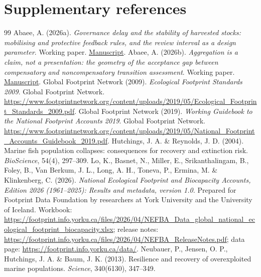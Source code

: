 \documentclass[11pt,a4paper]{article}
\begin{document}
\section*{Supplementary references}
\begin{thebibliography}{99}
\small
{} Abaee, A. (2026a). \emph{Governance delay and the stability of harvested stocks: mobilising and protective feedback rules, and the review interval as a design parameter}. Working paper. \href{https://github.com/MIKEAA2020/general-sustainability/blob/2efaa62083f2007dec3446c15c475af88f0925f3/arena%20agent%201/paper%20rewrites/latex/paper4_delay_dynamics_v41.pdf}{Manuscript}.
 Abaee, A. (2026b). \emph{Aggregation is a claim, not a presentation: the geometry of the acceptance gap between compensatory and noncompensatory transition assessment}. Working paper. \href{https://github.com/MIKEAA2020/general-sustainability/blob/2efaa62083f2007dec3446c15c475af88f0925f3/arena%20agent%201/paper%20rewrites/latex/paper06_assessment_separation_v71.pdf}{Manuscript}.
 Global Footprint Network (2009). \emph{Ecological Footprint Standards 2009}. Global Footprint Network. \url{https://www.footprintnetwork.org/content/uploads/2019/05/Ecological_Footprint_Standards_2009.pdf}.
 Global Footprint Network (2019). \emph{Working Guidebook to the National Footprint Accounts 2019}. Global Footprint Network. \url{https://www.footprintnetwork.org/content/uploads/2019/05/National_Footprint_Accounts_Guidebook_2019.pdf}.
 Hutchings, J. A. \& Reynolds, J. D. (2004). Marine fish population collapses: consequences for recovery and extinction risk. \emph{BioScience}, 54(4), 297--309.
 Lo, K., Basnet, N., Miller, E., Srikanthalingam, B., Foley, B., Van Berkum, J. L., Long, A. H., Toneva, P., Ermina, M. \& Klinkenberg, C. (2026). \emph{National Ecological Footprint and Biocapacity Accounts, Edition 2026 (1961--2025): Results and metadata, version 1.0.} Prepared for Footprint Data Foundation by researchers at York University and the University of Iceland. Workbook: \url{https://footprint.info.yorku.ca/files/2026/04/NEFBA_Data_global_national_ecological_footprint_biocapacity.xlsx}; release notes: \url{https://footprint.info.yorku.ca/files/2026/04/NEFBA_ReleaseNotes.pdf}; data page: \url{https://footprint.info.yorku.ca/data/}.
 Neubauer, P., Jensen, O. P., Hutchings, J. A. \& Baum, J. K. (2013). Resilience and recovery of overexploited marine populations. \emph{Science}, 340(6130), 347--349.

\end{thebibliography}
\end{document}
